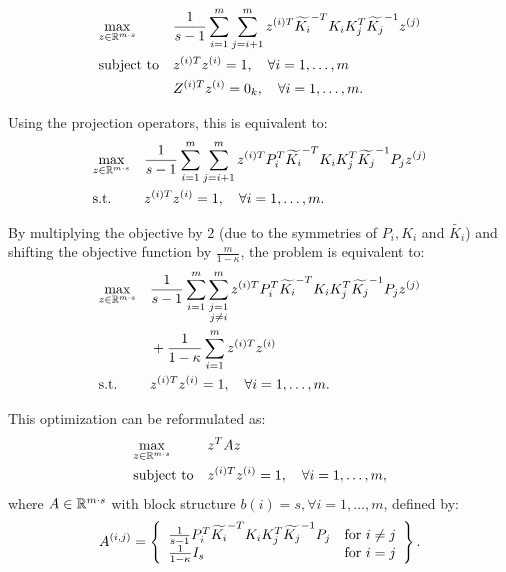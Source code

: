 \begin{equation}\label{eq:Zkdimapproxdualqcqp}
\begin{aligned}
& \underset{z \in \mathbb{R}^{m\cdot s}}{\text{max}}
& & \frac{1}{s -1} \sum_{i = 1}^m \sum_{j = i+1}^m z^{(i)T} \widetilde{K_i}^{-T} K_i K_j^T \widetilde{K_j}^{-1} z^{(j)} \\
& \text{subject to}
& & z^{(i)T}  z^{(i)} = 1, \quad\forall i = 1,\ldots, m\\
& & & Z^{(i)T} z^{(i)} = 0_k, \quad\forall i = 1,\ldots, m.
\end{aligned}
\end{equation}

Using the projection operators, this is equivalent to:
\begin{equation*}
\begin{aligned}
& \underset{z \in \mathbb{R}^{m\cdot s}}{\text{max}}
& & \frac{1}{s -1} \sum_{i = 1}^m \sum_{j = i+1}^m z^{(i)T} P_i^T \widetilde{K_i}^{-T} K_i K_j^T \widetilde{K_j}^{-1} P_j z^{(j)}\\
& \text{s.t.}
& & z^{(i)T}  z^{(i)} = 1, \quad\forall i = 1,\ldots, m.
\end{aligned}
\end{equation*}

By multiplying the objective by $2$ (due to the symmetries of $P_i, K_i$ and $\widetilde{K_i}$)
and shifting the objective function by $\frac{m}{1 - \kappa}$, the problem is equivalent to:
\begin{equation}
\begin{aligned}
& \underset{z \in \mathbb{R}^{m\cdot s}}{\text{max}}
& & \frac{1}{s -1} \sum_{i = 1}^m \sum_{\substack{j = 1\\ j\neq i}}^m z^{(i)T} P_i^T \widetilde{K_i}^{-T} K_i K_j^T \widetilde{K_j}^{-1} P_j z^{(j)}\\
&&& + \frac{1}{1-\kappa}\sum_{i = 1}^m z^{(i)T}  z^{(i)}\\
& \text{s.t.}
& & z^{(i)T}  z^{(i)} = 1, \quad\forall i = 1,\ldots, m.
\end{aligned}
\end{equation}

This optimization can be reformulated as:
\begin{equation}\label{eq:projZkdimapproxdualqcqp}
\begin{aligned}
& \underset{z \in \mathbb{R}^{m\cdot s}}{\text{max}}
& & z^T A z\\
& \text{subject to}
& & z^{(i)T}  z^{(i)} = 1, \quad\forall i = 1,\ldots, m,
\end{aligned}
\end{equation}
where $A \in \mathbb{R}^{m\cdot s}$ with block structure $b\left(i\right) = s, \forall i = 1,\ldots, m$, defined by:
\begin{equation*}
 A^{(i,j)} = \left\{ \begin{array}{lll}
 \frac{1}{s -1} P_i^T \widetilde{K_i}^{-T} K_i K_j^T \widetilde{K_j}^{-1} P_j  & {\rm for} ~i \neq j\\
\frac{1}{1-\kappa } I_s & {\rm for} ~i = j \end{array}\right\}.
\end{equation*}

